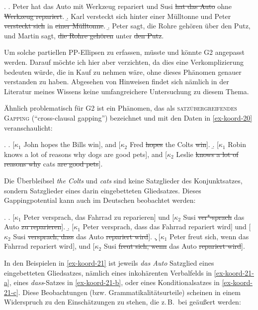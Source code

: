 \ex. \label{ex-koord-28}
\a. \label{ex-koord-28-a} Peter hat das Auto mit Werkzeug repariert und Susi \sout{hat das Auto} ohne \sout{Werkzeug repariert}.
\b. \label{ex-koord-28-b}Karl versteckt sich hinter einer Mülltonne und Peter \sout{versteckt sich} in \sout{einer Mülltonne}.
\b. \label{ex-koord-28-c} Peter sagt, die Rohre gehören über den Putz, und Martin sagt, \sout{die Rohre gehören} unter \sout{den Putz}. \hfill \cite[149, Fußnote 6]{Hartmann:00}

Um solche partiellen PP-Ellipsen zu erfassen, müsste und könnte G2 angepasst werden. Darauf möchte ich hier aber verzichten, da dies eine Verkomplizierung bedeuten würde, die in Kauf zu nehmen wäre, ohne dieses Phänomen genauer verstanden zu haben. Abgesehen von Hinweisen findet sich nämlich in der Literatur meines Wissens keine umfangreichere Untersuchung zu diesem Thema.  

Ähnlich problematisch für G2 ist ein Phänomen, das \cite{Little:10} als \textsc{satzübergreifendes Gapping} ("`cross-clausal gapping"') bezeichnet und mit den Daten in \ref{ex-koord-20} veranschaulicht: 

\ex. \label{ex-koord-20}
\a. \label{ex-koord-20-a}[$\kappa_1$ John hopes the Bills win], and [$\kappa_2$ Fred \sout{hopes} the Colts \sout{win}]. \hfill \cite[(20a)]{Little:10}
\b. \label{ex-koord-20-b}[$\kappa_1$ Robin knows a lot of reasons why dogs are good pets], and [$\kappa_2$ Leslie \sout{knows a lot of reasons why} cats \sout{are good pets}].	\hfill \cite[273]{Culicover:Jackendoff:05}

Die Überbleibsel {\it the Colts} und {\it cats} sind keine Satzglieder des Konjunktsatzes, sondern Satzglieder eines darin eingebetteten Gliedsatzes. Dieses Gappingpotential kann auch im Deutschen beobachtet werden: 

\ex. \label{ex-koord-21}
\a. \label{ex-koord-21-a}[$\kappa_1$ Peter versprach, das Fahrrad zu reparieren] und [$\kappa_2$ Susi \sout{ver"-sprach} das Auto \sout{zu reparieren}].
\b. \label{ex-koord-21-b}[$\kappa_1$ Peter versprach, dass das Fahrrad repariert wird] und [$\kappa_2$ Susi \sout{versprach, dass} das Auto \sout{repariert wird}].
\c. \label{ex-koord-21-c}[$\kappa_1$ Peter freut sich, wenn das Fahrrad repariert wird], und [$\kappa_2$ Susi \sout{freut sich, wenn} das Auto \sout{repariert wird}].    

In den Beispielen in \ref{ex-koord-21} ist jeweils {\it das Auto} Satzglied eines eingebetteten Gliedsatzes, nämlich eines inkohärenten Verbalfelds in \ref{ex-koord-21-a}, eines \emph{dass}-Satzes in \ref{ex-koord-21-b}, oder eines Konditionalsatzes in \ref{ex-koord-21-c}. Diese Beobachtungen (bzw. Grammatikalitätsurteile) scheinen in einem Widerspruch zu den Einschätzungen zu stehen, die z.\,B.\  bei \cite{Neijt:79} geäu\ss ert werden:


